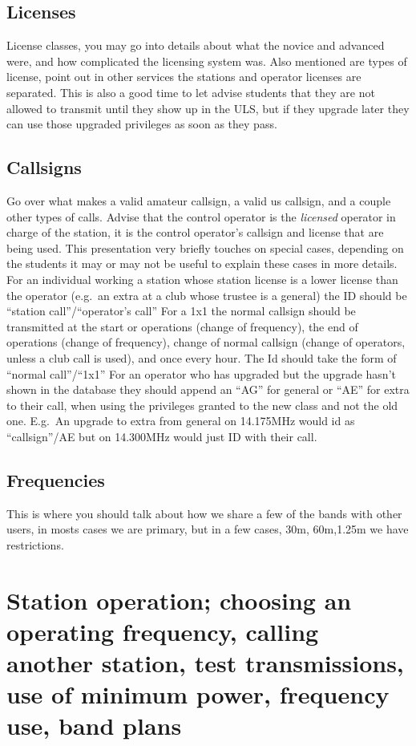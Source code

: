 \documentclass[12pt,letterpaper]{report}
\begin{document}
\subsection*{Licenses}
License classes, you may go into details about what the novice and advanced were, and how complicated the licensing system was. Also mentioned are types of license, point out in other services the stations and operator licenses are separated. This is also a good time to let advise students that they are not allowed to transmit until they show up in the ULS, but if they upgrade later they can use those upgraded privileges as soon as they pass.

\subsection*{Callsigns}
Go over what makes a valid amateur callsign, a valid us callsign, and a couple other types of calls. Advise that the control operator is the \textit{licensed} operator in charge of the station, it is the control operator's callsign and license that are being used. This presentation very briefly touches on special cases, depending on the students it may or may not be useful to explain these cases in more details.
For an individual working a station whose station license is a lower license than the operator (e.g.\ an extra at a club whose trustee is a general) the ID should be ``station call''/``operator's call''
For a 1x1 the normal callsign should be transmitted at the start or operations (change of frequency), the end of operations (change of frequency), change of normal callsign (change of operators, unless a club call is used), and once every hour. The Id should take the form of ``normal call''/``1x1''
For an operator who has upgraded but the upgrade hasn't shown in the database they should append an ``AG'' for general or ``AE'' for extra to their call, when using the privileges granted to the new class and not the old one. E.g.\ An upgrade to extra from general on 14.175MHz would id as ``callsign''/AE but on 14.300MHz would just ID with their call.

\subsection*{Frequencies}
This is where you should talk about how we share a few of the bands with other users, in mosts cases we are primary, but in a few cases, 30m, 60m,1.25m we have restrictions.

\section*{Station operation; choosing an operating frequency, calling another station, test transmissions, use of minimum power, frequency use, band plans}
\end{document}
